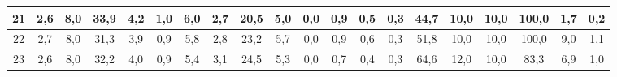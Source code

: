 \begin{sidewaystable}[]
\begin{tabular}{|c|c|c|c|c|c|c|c|c|c|c|c|c|c|c|c|c|c|c|c|}
    21 & 2,6                                              & 8,0                                              & 33,9                                             & 4,2                                              & 1,0                                              & 6,0                                              & 2,7                                              & 20,5                                             & 5,0                                              & 0,0                                              & 0,9                                              & 0,5                                              & 0,3                                              & 44,7                                            & 10,0                                            & 10,0                                            & 100,0                                           & 1,7                                             & 0,2                                             \\ \hline
    22 & 2,7                                              & 8,0                                              & 31,3                                             & 3,9                                              & 0,9                                              & 5,8                                              & 2,8                                              & 23,2                                             & 5,7                                              & 0,0                                              & 0,9                                              & 0,6                                              & 0,3                                              & 51,8                                            & 10,0                                            & 10,0                                            & 100,0                                           & 9,0                                             & 1,1                                             \\ \hline
    23 & 2,6                                              & 8,0                                              & 32,2                                             & 4,0                                              & 0,9                                              & 5,4                                              & 3,1                                              & 24,5                                             & 5,3                                              & 0,0                                              & 0,7                                              & 0,4                                              & 0,3                                              & 64,6                                            & 12,0                                            & 10,0                                            & 83,3                                            & 6,9                                             & 1,0                                             \\ \hline

\end{tabular}
\end{sidewaystable}
